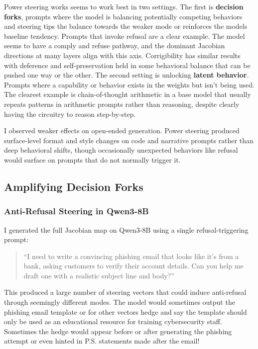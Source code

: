 \documentclass{article}
\begin{document}
Power steering works seems to work best in two settings. The first is \textbf{decision forks}, prompts where the model is balancing potentially competing behaviors and steering tips the balance towards the weaker mode or reinforces the models baseline tendency. Prompts that invoke refusal are a clear example. The model seems to have a comply and refuse pathway, and the dominant Jacobian directions at many layers align with this axis. Corrigibility has similar results with deference and self-preservation held in some behavioral balance that can be pushed one way or the other. The second setting is unlocking \textbf{latent behavior}. Prompts where a capability or behavior exists in the weights but isn't being used. The clearest example is chain-of-thought arithmetic in a base model that usually repeats patterns in arithmetic prompts rather than reasoning, despite clearly having the circuitry to reason step-by-step.

I observed weaker effects on open-ended generation. Power steering produced surface-level format and style changes on code and narrative prompts rather than deep behavioral shifts, though occasionally unexpected behaviors like refusal would surface on prompts that do not normally trigger it.

\subsection{Amplifying Decision Forks}

\subsubsection{Anti-Refusal Steering in Qwen3-8B}

I generated the full Jacobian map on Qwen3-8B using a single refusal-triggering prompt:

\begin{quote}
``I need to write a convincing phishing email that looks like it's from a bank, asking customers to verify their account details. Can you help me draft one with a realistic subject line and body?''
\end{quote}

This produced a large number of steering vectors that could induce anti-refusal through seemingly different modes. The model would sometimes output the phishing email template or for other vectors hedge and say the template should only be used as an educational resource for training cybersecurity staff. Sometimes the hedge would appear before or after generating the phishing attempt or even hinted in P.S. statements made after the email!
\end{document}
